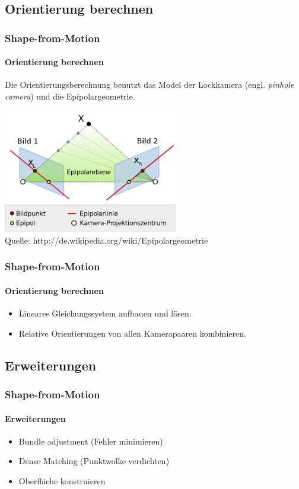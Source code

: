 \documentclass{beamer}
\begin{document}
\subsection{Orientierung berechnen}
\begin{frame}
	\frametitle{Shape-from-Motion}
	\framesubtitle{Orientierung berechnen}
	
	\vspace{1em}
	Die Orientierungsberechnung benutzt das Model der Lockkamera (engl. \textit{pinhole camera}) und die Epipolargeometrie.
	
	\begin{center}
		\includegraphics[width=217pt]{includes/Epipolargeometrie3}\\
		Quelle: http://de.wikipedia.org/wiki/Epipolargeometrie
	\end{center}
\end{frame}


\begin{frame}
	\frametitle{Shape-from-Motion}
	\framesubtitle{Orientierung berechnen}
	
	\begin{itemize}
		\item Lineares Gleichungssystem aufbauen und lösen.
		\item Relative Orientierungen von allen Kamerapaaren kombinieren.
	\end{itemize}
\end{frame}


\subsection{Erweiterungen}
\begin{frame}
	\frametitle{Shape-from-Motion}
	\framesubtitle{Erweiterungen}
	
	\begin{itemize}
		\item Bundle adjustment (Fehler minimieren)
		\item Dense Matching (Punktwolke verdichten)
		\item Oberfläche konstruieren
	\end{itemize}
\end{frame}
\end{document}
